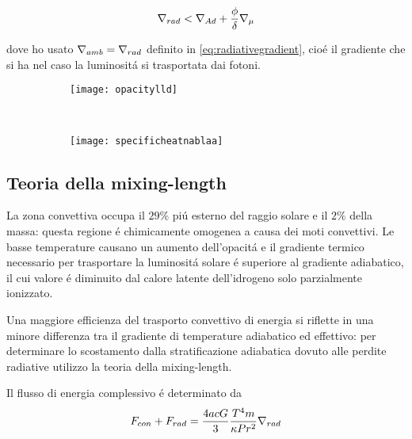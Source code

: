 \documentclass[../main.tex]{subfiles}
\begin{document}
\begin{equation}
\nabla_{rad}{}<\nabla_{Ad}+\frac{\phi}{\delta}\nabla_{\mu}{}\label{eq:ledoux}
\end{equation}

dove ho usato $\nabla_{amb}=\nabla_{rad}{}$ definito in \eqref{eq:radiativegradient}, cio\'e il gradiente che si ha nel caso la luminosit\'a si trasportata dai fotoni.

\begin{figure}[!h]
\begin{subfigure}[t]{0.5\linewidth}
\centering
\texttt{[image: opacitylld]}
\end{subfigure}
~
\begin{subfigure}[t]{0.5\linewidth}
\centering
\texttt{[image: specificheatnablaa]}
\end{subfigure}
    
\end{figure}

\subsection{Teoria della mixing-length}

La zona convettiva occupa il $29\%$ pi\'u esterno del raggio solare e il $2\%$ della massa: questa regione \'e chimicamente omogenea a causa dei moti convettivi. Le basse temperature causano un aumento dell'opacit\'a e il gradiente termico necessario per trasportare la luminosit\'a solare \'e superiore al gradiente adiabatico, il cui valore \'e diminuito dal calore latente dell'idrogeno solo parzialmente ionizzato.

Una maggiore efficienza del trasporto convettivo di energia si riflette in una minore differenza tra il gradiente di temperature adiabatico ed effettivo: per determinare lo scostamento dalla stratificazione adiabatica dovuto alle perdite radiative utilizzo la teoria della mixing-length.

Il flusso di energia complessivo \'e determinato da
\begin{equation}
F_{con}+F_{rad}=\frac{4acG}{3}\frac{T^4m}{\kappa Pr^2}\nabla_{rad}{}\label{eq:totalflux}
\end{equation}
\end{document}

